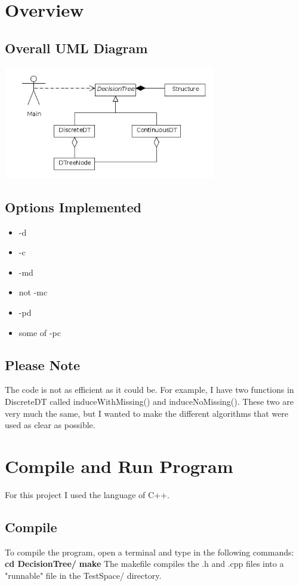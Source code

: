 \documentclass[a4paper]{article}
\begin{document}

\tableofcontents
\newpage

\section{Overview}
	\subsection{Overall UML Diagram}
		\begin{center}
			\includegraphics[width=350px]{overview.jpg}	
		\end{center}
		
	\subsection{Options Implemented}
	\begin{itemize}
	\item -d
	\item -c
	\item -md
	\item not -mc
	\item -pd
	\item some of -pc
	\end{itemize}		
	
	\subsection{Please Note}
	The code is not as efficient as it could be. For example, I have two functions in DiscreteDT called induceWithMissing() and induceNoMissing(). These two are very much the same, but I wanted to make the different algorithms that were used as clear as possible.
\section{Compile and Run Program}
For this project I used the language of C++.
	\subsection{Compile}
	To compile the program, open a terminal and type in the following commands:
	\newline
	\newline
	\textbf{cd DecisionTree/} \newline
	\textbf{make} 
	\newline
	\newline
	The makefile compiles the .h and .cpp files into a "runnable" file in the TestSpace/ directory.
	
\end{document}
